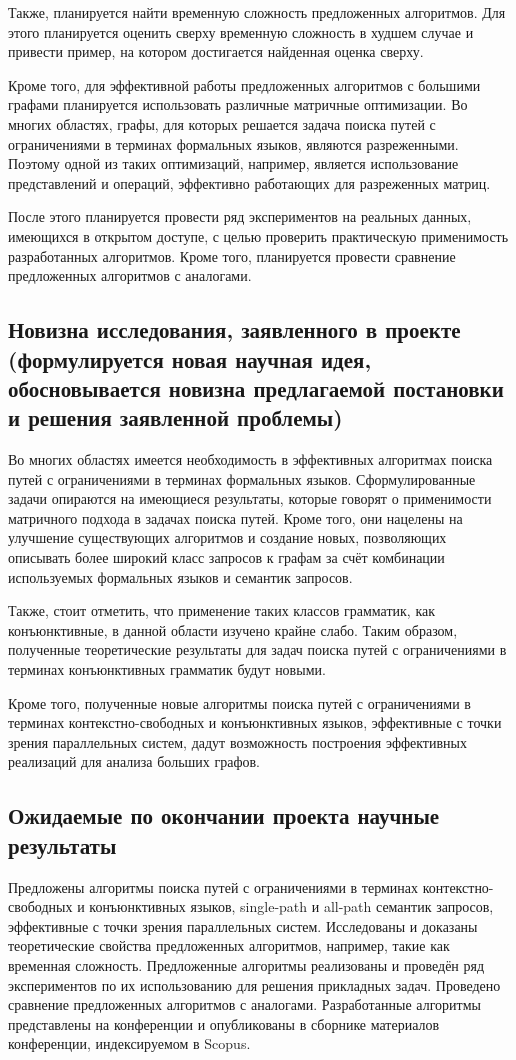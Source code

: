 \documentclass[12pt]{article}  %
\theoremstyle{remark}
\begin{document}
Также, планируется найти временную сложность предложенных алгоритмов. Для этого планируется оценить сверху временную сложность в худшем случае и привести пример, на котором достигается найденная оценка сверху.

Кроме того, для эффективной работы предложенных алгоритмов с большими графами планируется использовать различные матричные оптимизации. Во многих областях, графы, для которых решается задача поиска путей с ограничениями в терминах формальных языков, являются разреженными. Поэтому одной из таких оптимизаций, например, является использование представлений и операций, эффективно работающих для разреженных матриц.

После этого планируется провести ряд экспериментов на реальных данных, имеющихся в открытом доступе, с целью проверить практическую применимость разработанных алгоритмов. Кроме того, планируется провести сравнение предложенных алгоритмов с аналогами.

\subsection{Новизна исследования, заявленного в проекте (формулируется новая научная идея, обосновывается новизна предлагаемой постановки и решения заявленной проблемы)}
Во многих областях имеется необходимость в эффективных алгоритмах поиска путей с ограничениями в терминах формальных языков. Сформулированные задачи опираются на имеющиеся результаты, которые говорят о применимости матричного подхода в задачах поиска путей. Кроме того, они нацелены на улучшение существующих алгоритмов и создание новых, позволяющих описывать более широкий класс запросов к графам за счёт комбинации используемых формальных языков и семантик запросов.

Также, стоит отметить, что применение таких классов грамматик, как конъюнктивные, в данной области   изучено крайне слабо. Таким образом, полученные теоретические результаты для задач поиска путей с ограничениями в терминах конъюнктивных грамматик будут новыми.

Кроме того, полученные новые алгоритмы поиска путей с ограничениями в терминах контекстно-свободных и конъюнктивных языков, эффективные с точки зрения параллельных систем, дадут возможность построения эффективных реализаций для анализа больших графов.

\subsection{Ожидаемые по окончании проекта научные результаты}
Предложены алгоритмы поиска путей с ограничениями в терминах контекстно-свободных и конъюнктивных языков, single-path и all-path семантик запросов, эффективные с точки зрения параллельных систем. Исследованы и доказаны теоретические свойства предложенных алгоритмов, например, такие как временная сложность. Предложенные алгоритмы реализованы и проведён ряд экспериментов по их использованию для решения прикладных задач. Проведено сравнение предложенных алгоритмов с аналогами. Разработанные алгоритмы представлены на конференции и опубликованы в сборнике материалов конференции, индексируемом в Scopus.
\end{document}
